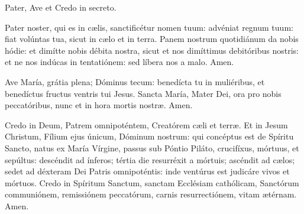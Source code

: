 \documentclass[12pt,a5paper,openright]{memoir}
\begin{document}
\switchcolumn



\switchcolumn*
{}

Pater, Ave et Credo in secreto.

\switchcolumn


\switchcolumn*

Pater noster, qui es in cælis, sanctificétur nomen tuum: advéniat regnum tuum: fiat volúntas tua, sicut in cælo et in terra. Panem nostrum quotidiánum da nobis hódie: et dimítte nobis débita nostra, sicut et nos dimíttimus debitóribus nostris: et ne nos indúcas in tentatiónem: sed líbera nos a malo. Amen.

\switchcolumn


\switchcolumn*

Ave María, grátia plena; Dóminus tecum: benedícta tu in muliéribus, et benedíctus fructus ventris tui Jesus. Sancta María, Mater Dei, ora pro nobis peccatóribus, nunc et in hora mortis nostræ. Amen.


\switchcolumn


\switchcolumn*

Credo in Deum, Patrem omnipoténtem, Creatórem cæli et terræ. Et in Jesum Christum, Fílium ejus únicum, Dóminum nostrum: qui concéptus est de Spíritu Sancto, natus ex María Vírgine, passus sub Póntio Piláto, crucifíxus, mórtuus, et sepúltus: descéndit ad ínferos; tértia die resurréxit a mórtuis; ascéndit ad cælos; sedet ad déxteram Dei Patris omnipoténtis: inde ventúrus est judicáre vivos et mórtuos. Credo in Spíritum Sanctum, sanctam Ecclésiam cathólicam, Sanctórum communiónem, remissiónem peccatórum, carnis resurrectiónem, vitam ætérnam. Amen.
\switchcolumn
\end{document}

